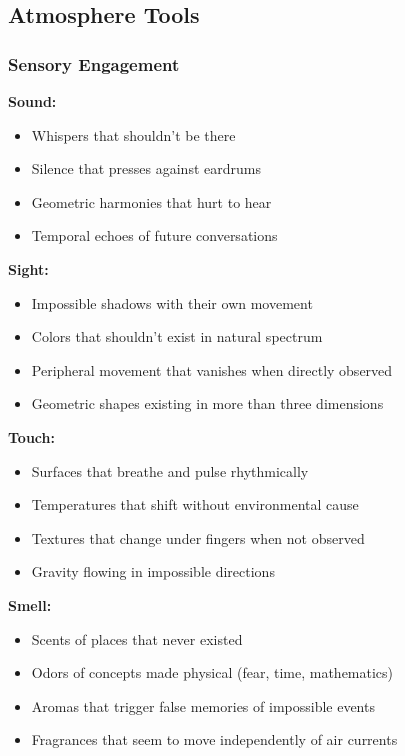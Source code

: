 \documentclass[11pt]{article}
\begin{document}
\subsection{Atmosphere Tools}

\subsubsection{Sensory Engagement}

\textbf{Sound:}
\begin{itemize}
\item Whispers that shouldn't be there
\item Silence that presses against eardrums
\item Geometric harmonies that hurt to hear
\item Temporal echoes of future conversations
\end{itemize}

\textbf{Sight:}
\begin{itemize}
\item Impossible shadows with their own movement
\item Colors that shouldn't exist in natural spectrum
\item Peripheral movement that vanishes when directly observed
\item Geometric shapes existing in more than three dimensions
\end{itemize}

\textbf{Touch:}
\begin{itemize}
\item Surfaces that breathe and pulse rhythmically
\item Temperatures that shift without environmental cause
\item Textures that change under fingers when not observed
\item Gravity flowing in impossible directions
\end{itemize}

\textbf{Smell:}
\begin{itemize}
\item Scents of places that never existed
\item Odors of concepts made physical (fear, time, mathematics)
\item Aromas that trigger false memories of impossible events
\item Fragrances that seem to move independently of air currents
\end{itemize}
\end{document}
